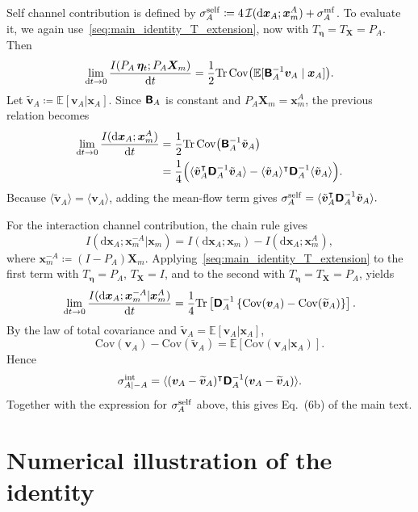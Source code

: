 Self channel contribution is defined by $
    \sigma_A^{\rm self}\coloneq4\,\mathcal I(\mathrm d\bm x_A;\bm x_m^A)+\sigma_A^{\rm mf}$.
To evaluate it, we again use~\eqref{seq:main_identity_T_extension}, now with $T_{\bm\eta}=T_{\bm X}=P_A$.
Then
\[
    \lim_{\mathrm dt\rightarrow0}\frac{I(P_A\,\bm\eta_t;P_A\bm X_m)}{\mathrm dt}
    =\frac{1}{2}\mathrm{Tr}\,\mathrm{Cov}\big(\mathbb E[\boldsymbol{\mathsf{B}}_A^{-1}\bm v_A\mid\bm x_A]\big).
\]
Let $\tilde{\bm v}_A\coloneq\mathbb E[\bm v_A|\bm x_A]$. Since $\boldsymbol{\mathsf{B}}_A$ is constant and $P_A\bm X_m=\bm x_m^A$, the previous relation becomes
\begin{equation*}
    \begin{aligned}
        \lim_{\mathrm dt\rightarrow0}\frac{I(\mathrm d\bm x_A;\bm x_m^A)}{\mathrm dt}
        &=\frac{1}{2}\mathrm{Tr}\,\mathrm{Cov}\big(\boldsymbol{\mathsf{B}}_A^{-1}\tilde{\bm v}_A\big)
        \\
        &=\frac{1}{4}\Big(\langle\tilde{\bm v}_A^\intercal\boldsymbol{\mathsf{D}}_A^{-1}\tilde{\bm v}_A\rangle
        -\langle\tilde{\bm v}_A\rangle^\intercal\boldsymbol{\mathsf{D}}_A^{-1}\langle\tilde{\bm v}_A\rangle\Big).
    \end{aligned}
\end{equation*}
Because $\langle\tilde{\bm v}_A\rangle=\langle\bm v_A\rangle$, adding the mean-flow term gives $
    \sigma_A^{\rm self}=\langle\tilde{\bm v}_A^\intercal\boldsymbol{\mathsf{D}}_A^{-1}\tilde{\bm v}_A\rangle.$

For the interaction channel contribution, the chain rule gives
\[
    I(\mathrm d\bm x_A;\bm x_m^{-A}|\bm x_m)
    =I(\mathrm d\bm x_A;\bm x_m)-I(\mathrm d\bm x_A;\bm x_m^A),
\]
where $\bm x_m^{-A}\coloneq(I-P_A)\bm X_m$. Applying~\eqref{seq:main_identity_T_extension} to the first term with $T_{\bm\eta}=P_A$, $T_{\bm X}=I$, and to the second with $T_{\bm\eta}=T_{\bm X}=P_A$, yields
\[
    \lim_{\mathrm dt\rightarrow0}\frac{I(\mathrm d\bm x_A;\bm x_m^{-A}|\bm x_m^A)}{\mathrm dt}
    =\frac{1}{4}\mathrm{Tr}\left[\boldsymbol{\mathsf{D}}_A^{-1}\left\{\mathrm{Cov}(\bm v_A)-\mathrm{Cov}(\widetilde{\bm v}_A)\right\}\right].
\]
By the law of total covariance and $\widetilde{\bm v}_A=\mathbb E[\bm v_A|\bm x_A]$,
\[
    \mathrm{Cov}(\bm v_A)-\mathrm{Cov}(\widetilde{\bm v}_A)
    =\mathbb E[\mathrm{Cov}(\bm v_A|\bm x_A)].
\]
Hence
\[
    \sigma_{A|-A}^{\rm int}=\langle(\bm v_A-\widetilde{\bm v}_A)^\intercal\boldsymbol{\mathsf{D}}_A^{-1}(\bm v_A-\widetilde{\bm v}_A)\rangle.
\]
Together with the expression for $\sigma_A^{\rm self}$ above, this gives Eq.~(6b) of the main text.

\section{Numerical illustration of the identity}
\vspace*{-0.6\baselineskip}

